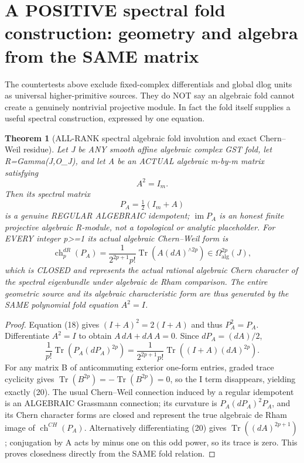 \documentclass[11pt]{article}
\newtheorem{theorem}{Theorem}[section]
\begin{document}
\section{A POSITIVE spectral fold construction: geometry and algebra from the SAME matrix}
The countertests above exclude fixed-complex
differentials and global dlog units as universal
higher-primitive sources. They do NOT say an
algebraic fold cannot create a genuinely
nontrivial projective module. In fact the
fold itself supplies a useful spectral
construction, expressed by one equation.

\begin{theorem}[ALL-RANK spectral algebraic fold involution and exact Chern--Weil residue]
Let J be ANY smooth affine algebraic
complex GST fold, let R=Gamma(J,O_J),
and let A be an ACTUAL algebraic
m-by-m matrix satisfying
\[
 \boxed{A^2=I_m.}                                       \tag{18}
\]
Then its spectral matrix
\[
 \boxed{P_A=\tfrac12(I_m+A)}
                                                               \tag{19}
\]
is a genuine REGULAR ALGEBRAIC
idempotent; $\operatorname{im}P_A$
is an honest finite projective
algebraic R-module, not a
topological or analytic placeholder.
For EVERY integer p>=1 its
actual algebraic Chern--Weil
form is
\[
 \boxed{
 \operatorname{ch}^{dR}_p(P_A)
 =\frac1{2^{2p+1}p!}
       \operatorname{Tr}
              \left(A(dA)^{\wedge 2p}\right)
       \in\Omega_{\mathrm{alg}}^{2p}(J),
 }                                                     \tag{20}
\]
which is CLOSED and represents
the actual rational algebraic Chern
character of the spectral eigenbundle
under algebraic de Rham comparison.
The entire geometric source and its
algebraic characteristic form
are thus generated by the SAME
polynomial fold equation $A^2=I$.
\end{theorem}
\begin{proof}
Equation (18) gives
$(I+A)^2=2(I+A)$ and
thus $P_A^2=P_A$.
Differentiate $A^2=I$ to obtain
$A\,dA+dA\,A=0$. Since
$dP_A=(dA)/2$,
\[
 \frac1{p!}\operatorname{Tr}
   (P_A(dP_A)^{2p})
 =\frac1{2^{2p+1}p!}
     \operatorname{Tr}((I+A)(dA)^{2p}).
\]
For any matrix B of
anticommuting exterior one-form
entries, graded trace cyclicity
gives
$\operatorname{Tr}(B^{2p})
=-\operatorname{Tr}(B^{2p})=0$,
so the I term disappears,
yielding exactly (20).
The usual Chern--Weil
connection induced by a
regular idempotent is an
ALGEBRAIC Grassmann connection;
its curvature is
$P_A(dP_A)^2P_A$,
and its Chern character
forms are closed and
represent the true algebraic
de Rham image of
$\operatorname{ch}^{CH}(P_A)$.
Alternatively differentiating
(20) gives
$\operatorname{Tr}((dA)^{2p+1})$;
conjugation by A acts by
minus one on this odd
power, so its trace is
zero. This proves closedness
directly from the SAME
fold relation.
\end{proof}
\end{document}
